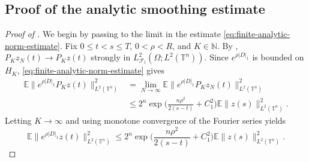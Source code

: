 \documentclass[print,wide]{draft}
\begin{document}
\subsection{Proof of the analytic smoothing estimate}

\begin{proof}[Proof of ]
We begin by passing to the limit in the  estimate \eqref{eq:finite-analytic-norm-estimate}. Fix \(0\leq t<s\leq T\), \(0<\rho<R\), and \(K\in\mathbb N\).
By , \(P_K z_N(t)\to P_K z(t)\) strongly in
\(L^2_{\mathcal F_t}(\Omega;L^2(\mathbb T^n))\). Since \(e^{\rho|D|_1}\) is bounded on \(H_K\), \eqref{eq:finite-analytic-norm-estimate} gives
\begin{align*}
\mathbb{E}\bigl\lVert e^{\rho|D|_1}P_K z(t)\bigr\rVert_{L^2(\mathbb T^n)}^2
&=\lim_{N\to\infty}
\mathbb{E}\bigl\lVert e^{\rho|D|_1}P_K z_N(t)\bigr\rVert_{L^2(\mathbb T^n)}^2\\
&\leq
2^n\exp\biggl(\frac{n\rho^2}{2(s-t)}+C_1^2\biggr)
\mathbb{E}\lVert z(s)\rVert_{L^2(\mathbb T^n)}^2.
\end{align*}
Letting \(K\to\infty\) and using monotone convergence of the Fourier series yields
\begin{equation}
	\label{eq:infinite-analytic-norm-estimate}
	\mathbb{E}\bigl\lVert e^{\rho|D|_1}z(t)\bigr\rVert_{L^2(\mathbb T^n)}^2
	\leq
	2^n\exp\biggl(\frac{n\rho^2}{2(s-t)}+C_1^2\biggr)
	\mathbb{E}\lVert z(s)\rVert_{L^2(\mathbb T^n)}^2.
\end{equation}


\end{proof}
\end{document}

